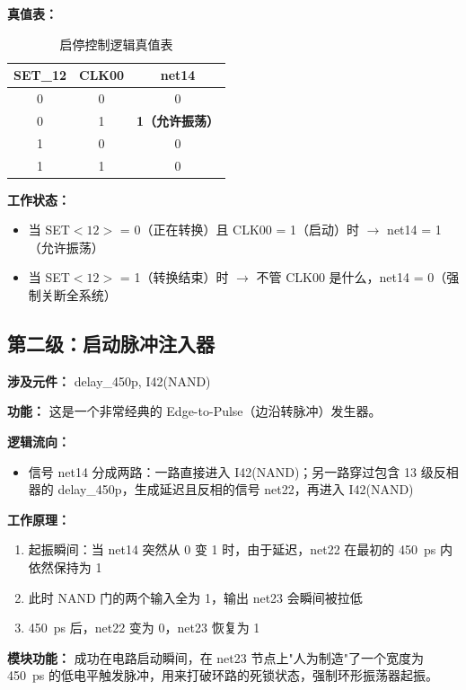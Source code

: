 \documentclass[11pt,a4paper,UTF8]{ctexart}
\begin{document}
\textbf{真值表：}

\begin{table}[htbp]
\centering
\caption{启停控制逻辑真值表}
\label{tab:gating_truth}
\begin{tabular}{cc|c}
\toprule
SET\_12 & CLK00 & net14 \\
\midrule
0 & 0 & 0 \\
0 & 1 & \textbf{1（允许振荡）} \\
1 & 0 & 0 \\
1 & 1 & 0 \\
\bottomrule
\end{tabular}
\end{table}

\textbf{工作状态：}
\begin{itemize}
    \item 当 SET$<12>$ = 0（正在转换）且 CLK00 = 1（启动）时 $\rightarrow$ net14 = 1（允许振荡）
    \item 当 SET$<12>$ = 1（转换结束）时 $\rightarrow$ 不管 CLK00 是什么，net14 = 0（强制关断全系统）
\end{itemize}

\subsection{第二级：启动脉冲注入器}

\textbf{涉及元件：} delay\_450p, I42(NAND)

\textbf{功能：} 这是一个非常经典的 Edge-to-Pulse（边沿转脉冲）发生器。

\textbf{逻辑流向：}
\begin{itemize}
    \item 信号 net14 分成两路：一路直接进入 I42(NAND)；另一路穿过包含 13 级反相器的 delay\_450p，生成延迟且反相的信号 net22，再进入 I42(NAND)
\end{itemize}

\textbf{工作原理：}
\begin{enumerate}
    \item 起振瞬间：当 net14 突然从 0 变 1 时，由于延迟，net22 在最初的 \SI{450}{ps} 内依然保持为 1
    \item 此时 NAND 门的两个输入全为 1，输出 net23 会瞬间被拉低
    \item \SI{450}{ps} 后，net22 变为 0，net23 恢复为 1
\end{enumerate}

\textbf{模块功能：} 成功在电路启动瞬间，在 net23 节点上"人为制造"了一个宽度为 \SI{450}{ps} 的低电平触发脉冲，用来打破环路的死锁状态，强制环形振荡器起振。
\end{document}
